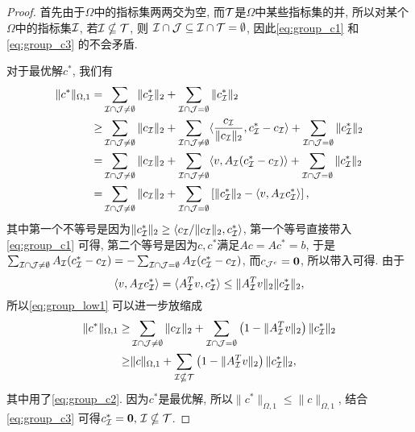 \begin{proof}
  首先由于$\Omega$中的指标集两两交为空, 而$\mathcal{T}$是$\Omega$中某些指标集的并, 
  所以对某个$\Omega$中的指标集$\mathcal{I}$, 若$\mathcal{I} \nsubseteq \mathcal{T}$, 则
  $\mathcal{I} \cap \mathcal{J}\subseteq \mathcal{I} \cap \mathcal{T} =\emptyset $, 因此\eqref{eq:group_c1} 和\eqref{eq:group_c3} 
  的不会矛盾.

  对于最优解$c^*$, 我们有
  \begin{align}
    \|c^*\|_{\Omega, 1} =& \sum_{\mathcal{I} \cap \mathcal{J}\neq \emptyset}\|c^*_{\mathcal{I}}\|_2 +
    \sum_{\mathcal{I} \cap \mathcal{J} = \emptyset} \|c^*_{\mathcal{I}}\|_2 \nonumber \\
    \ge& \sum_{\mathcal{I} \cap \mathcal{J}\neq \emptyset}\|c_{\mathcal{I}}\|_2 + 
    \sum_{\mathcal{I} \cap \mathcal{J}\neq \emptyset}\langle \frac{c_{\mathcal{I}}}{\|c_{\mathcal{I}}\|_2} , c^*_{\mathcal{I}}-c_{\mathcal{I}}\rangle +
    \sum_{\mathcal{I} \cap \mathcal{J}=\emptyset}\|c^*_{\mathcal{I}}\|_2 \nonumber \\
    =& \sum_{\mathcal{I} \cap \mathcal{J}\neq \emptyset}\|c_{\mathcal{I}}\|_2 + 
    \sum_{\mathcal{I} \cap \mathcal{J}\neq \emptyset}\langle v, A_{\mathcal{I}}(c^*_{\mathcal{I}}-c_{\mathcal{I}})\rangle +
    \sum_{\mathcal{I} \cap \mathcal{J} =\emptyset}\|c^*_{\mathcal{I}}\|_2 \nonumber \\
    =& \sum_{\mathcal{I} \cap \mathcal{J}\neq \emptyset}\|c_{\mathcal{I}}\|_2 +
    \sum_{\mathcal{I} \cap \mathcal{J} = \emptyset} \left[\|c^*_{\mathcal{I}}\|_2 -
    \langle v, A_{\mathcal{I}} c^*_{\mathcal{I}}\rangle\right],\label{eq:group_low1}
  \end{align}
  其中第一个不等号是因为$\|c^*_{\mathcal{I}}\|_2 \ge \langle c_{\mathcal{I}}/\|c_{\mathcal{I}}\|_2,c^*_{\mathcal{I}}\rangle$,
  第一个等号直接带入\eqref{eq:group_c1} 可得,
  第二个等号是因为$c,c^*$满足$Ac=Ac^*=b$, 于是$\sum_{\mathcal{I}\cap\mathcal{J} \neq
  \emptyset}A_{\mathcal{I}}(c_{\mathcal{I}}^*-c_{\mathcal{I}})=
  -\sum_{\mathcal{I} \cap\mathcal{J} =\emptyset} A_{\mathcal{I}}(c_{\mathcal{I}}^*-c_{\mathcal{I}})$,
  而$c_{\mathcal{J}^c}=\mathbf{0}$, 所以带入可得. 由于
  $$\langle v, A_{\mathcal{I}} c_{\mathcal{I}}^*\rangle = \langle A_{\mathcal{I}}^T v,
  c_{\mathcal{I}}^*\rangle \le \|A_{\mathcal{I}}^T v\|_2 \|c_{\mathcal{I}}^*\|_2,$$
  所以\eqref{eq:group_low1} 可以进一步放缩成
  \begin{align}
    \|c^*\|_{\Omega, 1} \ge& \sum_{\mathcal{I} \cap \mathcal{J}\neq \emptyset}\|c_{\mathcal{I}}\|_2 +
    \sum_{\mathcal{I} \cap \mathcal{J} = \emptyset} \left(1-\|A_{\mathcal{I}}^T v\|_2\right)\|c^*_{\mathcal{I}}\|_2 \nonumber \\
    \ge& \|c\|_{\Omega, 1} + \sum_{\mathcal{I} \nsubseteq \mathcal{T}}\left(1-\|A_{\mathcal{I}}^T
    v\|_2\right)\|c^*_{\mathcal{I}}\|_2,
    \label{eq:group_low2}
  \end{align}
  其中用了\eqref{eq:group_c2}.  因为$c^*$是最优解,
  所以$\|c^*\|_{\Omega,1}\le \|c\|_{\Omega, 1}$,
  结合\eqref{eq:group_c3} 可得$c^*_{\mathcal{I}} = \mathbf{0},\, \mathcal{I} \nsubseteq \mathcal{T}$.
\end{proof}

